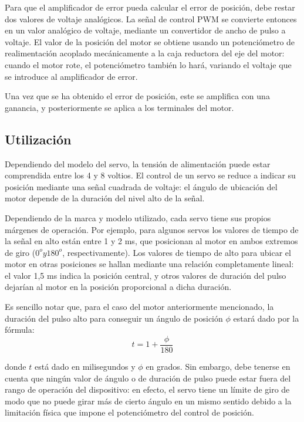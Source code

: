 \documentclass[../main]{subfiles}
\begin{document}

Para que el amplificador de error pueda calcular el error de posición, debe restar dos valores de voltaje analógicos. La señal de control PWM se convierte entonces en un valor analógico de voltaje, mediante un convertidor de ancho de pulso a voltaje. El valor de la posición del motor se obtiene usando un potenciómetro de realimentación acoplado mecánicamente a la caja reductora del eje del motor: cuando el motor rote, el potenciómetro también lo hará, variando el voltaje que se introduce al amplificador de error.

Una vez que se ha obtenido el error de posición, este se amplifica con una ganancia, y posteriormente se aplica a los terminales del motor.

\subsection{Utilización}
Dependiendo del modelo del servo, la tensión de alimentación puede estar comprendida entre los 4 y 8 voltios. El control de un servo se reduce a indicar su posición mediante una señal cuadrada de voltaje: el ángulo de ubicación del motor depende de la duración del nivel alto de la señal.

Dependiendo de la marca y modelo utilizado, cada servo tiene sus propios márgenes de operación. Por ejemplo, para algunos servos los valores de tiempo de la señal en alto están entre 1 y 2 ms, que posicionan al motor en ambos extremos de giro ($0^o y 180^o$, respectivamente). Los valores de tiempo de alto para ubicar el motor en otras posiciones se hallan mediante una relación completamente lineal: el valor 1,5 ms indica la posición central, y otros valores de duración del pulso dejarían al motor en la posición proporcional a dicha duración.

Es sencillo notar que, para el caso del motor anteriormente mencionado, la duración del pulso alto para conseguir un ángulo de posición $\phi$ estará dado por la fórmula:
\begin{equation}
  t=1+{\frac {\phi }{180}}  
\end{equation}

donde $t$ está dado en milisegundos y  $\phi$  en grados. Sin embargo, debe tenerse en cuenta que ningún valor de ángulo o de duración de pulso puede estar fuera del rango de operación del dispositivo: en efecto, el servo tiene un límite de giro de modo que no puede girar más de cierto ángulo en un mismo sentido debido a la limitación física que impone el potenciómetro del control de posición.
\end{document}
